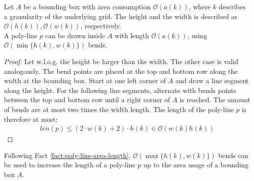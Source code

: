 \begin{fact}\label{fact:poly-line-area-length}
\end{fact}
Let $A$ be a bounding box with area consumption $\mathcal{O}(a(k))$, where $k$ describes a granularity of the underlying grid. The height and the width is described as $\mathcal{O}(h(k)), \mathcal{O}(w(k))$, respectively.  \\
A poly-line $p$ can be drawn inside $A$ with length $\mathcal{O}(a(k))$, using $\mathcal{O}(\min\{ h(k),w(k) \})$ bends.
\begin{proof}
	Let w.l.o.g. the height be larger than the width. The other case is valid analogously. The bend points are placed at the top and bottom row along the width at the bounding box. Start at one left corner of $A$ and draw a line segment along the height. For the following line segments, alternate with bends points between the top and bottom row until a right corner of $A$ is reached. The amount of bends are at most two times the width length. The length of the poly-line $p$ is therefore at most:
	\begin{align*}
		len(p) \leq (2\cdot w(k)+2) \cdot h(k) \in \mathcal{O}(w(k)h(k))
	\end{align*}
\end{proof}

\begin{fact}
\end{fact}
Following Fact \ref{fact:poly-line-area-length}, $\mathcal{O}(\max\{ h(k),w(k) \})$ bends can be used to increase the length of a poly-line $p$ up to the area usage of a bounding box $A$.

\begin{fact}\label{fact:poly-line-length-equal-arbitrary-shape-area}
\end{fact}

